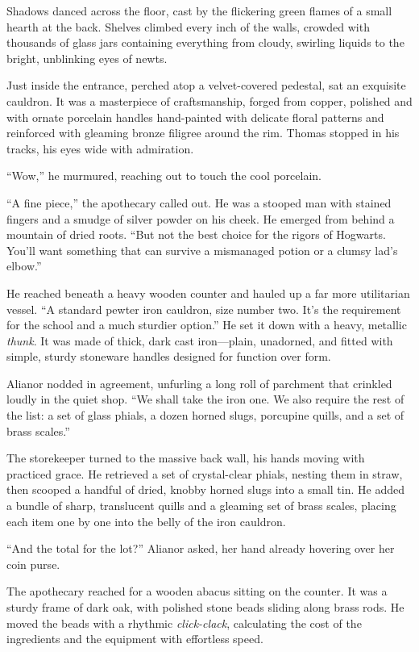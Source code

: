 Shadows danced across the floor, cast by the flickering green flames of a small hearth at the back. Shelves climbed every inch of the walls, crowded with thousands of glass jars containing everything from cloudy, swirling liquids to the bright, unblinking eyes of newts.

Just inside the entrance, perched atop a velvet-covered pedestal, sat an exquisite cauldron. It was a masterpiece of craftsmanship, forged from copper, polished and with ornate porcelain handles hand-painted with delicate floral patterns and reinforced with gleaming bronze filigree around the rim. Thomas stopped in his tracks, his eyes wide with admiration.

\enquote{Wow,} he murmured, reaching out to touch the cool porcelain.

\enquote{A fine piece,} the apothecary called out. He was a stooped man with stained fingers and a smudge of silver powder on his cheek. He emerged from behind a mountain of dried roots. \enquote{But not the best choice for the rigors of Hogwarts. You'll want something that can survive a mismanaged potion or a clumsy lad's elbow.}

He reached beneath a heavy wooden counter and hauled up a far more utilitarian vessel. \enquote{A standard pewter iron cauldron, size number two. It's the requirement for the school and a much sturdier option.} He set it down with a heavy, metallic \textit{thunk}. It was made of thick, dark cast iron---plain, unadorned, and fitted with simple, sturdy stoneware handles designed for function over form.

Alianor nodded in agreement, unfurling a long roll of parchment that crinkled loudly in the quiet shop. \enquote{We shall take the iron one. We also require the rest of the list: a set of glass phials, a dozen horned slugs, porcupine quills, and a set of brass scales.}

The storekeeper turned to the massive back wall, his hands moving with practiced grace. He retrieved a set of crystal-clear phials, nesting them in straw, then scooped a handful of dried, knobby horned slugs into a small tin. He added a bundle of sharp, translucent quills and a gleaming set of brass scales, placing each item one by one into the belly of the iron cauldron.

\enquote{And the total for the lot?} Alianor asked, her hand already hovering over her coin purse.

The apothecary reached for a wooden abacus sitting on the counter. It was a sturdy frame of dark oak, with polished stone beads sliding along brass rods. He moved the beads with a rhythmic \textit{click-clack}, calculating the cost of the ingredients and the equipment with effortless speed.

